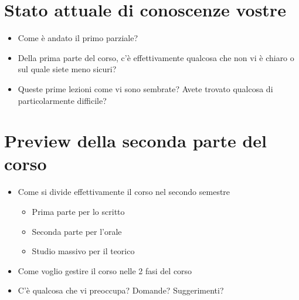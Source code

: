 \documentclass[a4paper]{article}
\begin{document}
\section*{Stato attuale di conoscenze vostre}
  \begin{itemize}
    \item Come è andato il primo parziale?
    \item Della prima parte del corso, c'è effettivamente qualcosa che non vi è chiaro o sul quale siete meno sicuri?
    \item Queste prime lezioni come vi sono sembrate? Avete trovato qualcosa di particolarmente difficile?
  \end{itemize}

\section*{Preview della seconda parte del corso}
  \begin{itemize}
    \item Come si divide effettivamente il corso nel secondo semestre
    \begin{itemize}
      \item Prima parte per lo scritto
      \item Seconda parte per l'orale
      \item Studio massivo per il teorico
    \end{itemize}
    \item Come voglio gestire il corso nelle 2 fasi del corso
    \item C'è qualcosa che vi preoccupa? Domande? Suggerimenti?
  \end{itemize}
\end{document}
